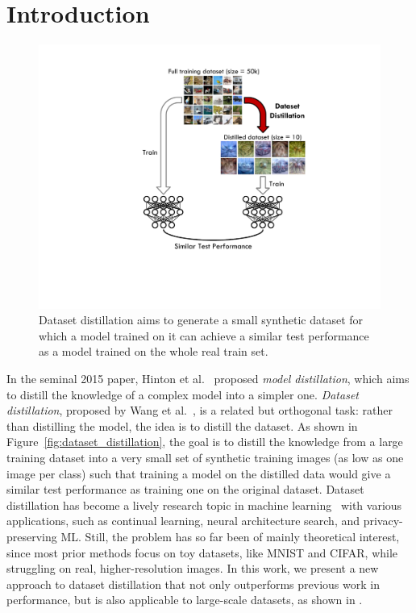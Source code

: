 \documentclass[main.tex]{subfiles}
\begin{document}
\section{Introduction}

\begin{figure}
    \centering
    \vspace{-0.5cm}%
    \includegraphics[scale=0.58, trim=230 106 150 20, clip]{figures/figure_2_dataset_distillation.pdf}\vspace{-0.85cm}
    \caption{Dataset distillation aims to generate a small synthetic dataset for which a model trained on it can achieve a similar test performance as a model trained on the whole real train set.}%
    \vspace{-5pt}
\end{figure}

In the seminal 2015 paper, Hinton et al.~\cite{hinton2015distilling} proposed {\em model distillation}, which aims to distill the knowledge of a complex model into a simpler one.  
{\em Dataset distillation}, proposed by Wang et al.~\cite{dd}, is a related but orthogonal task: rather
than distilling the model, the idea is to distill the dataset. 
As shown in Figure~\ref{fig:dataset_distillation}, the goal is to distill the knowledge from a large training dataset into a very small set of synthetic training images (as low as one image per class) such that training a model on the distilled data would give a similar test performance as training one on the original dataset. Dataset distillation has become a lively research topic in machine learning~\cite{bohdal2020flexible,sucholutsky2021soft,dc,dsa,nguyen2020dataset,nguyen2021dataset,dm} with various applications, such as continual learning, neural architecture search, and privacy-preserving ML. Still, the problem has so far been of mainly theoretical interest, since most prior methods focus on toy datasets, like MNIST and \mbox{CIFAR}, while struggling on real, higher-resolution images. In this work, we present a new approach to dataset distillation that not only outperforms previous work in performance, but is also applicable to large-scale datasets, as shown in .
\end{document}
